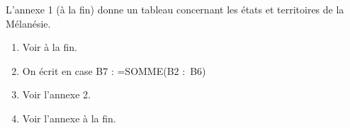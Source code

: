 
\medskip

L'annexe 1 (à la fin) donne un tableau concernant les états et territoires de la Mélanésie.
\medskip

\begin{enumerate}
\item %
Voir à la fin.
\item %

On écrit en case B7  : =SOMME(B2 :~B6)


\item %
Voir l'annexe 2.
\item %
Voir l'annexe à la fin.
\end{enumerate}

